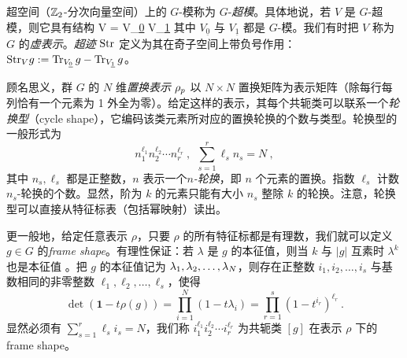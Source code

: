 超空间（$\mathbb{Z}_2$-分次向量空间）上的 $G$-模称为 $G$-\emph{超模}。具体地说，若 $V$ 是 $G$-超模，则它具有结构
\be\label{def:supermodule}
V  = V_{\underline{0}} \oplus V_{\underline{1}}
\ee
其中 $V_{\underline{0}}$ 与 $V_{\underline{1}}$ 都是 $G$-模。我们有时把 $V$ 称为 $G$ 的\emph{虚表示}。\emph{超迹} ${\operatorname{Str}}$ 定义为其在奇子空间上带负号作用：${\operatorname{Str}}_V g := \operatorname{Tr}_{V_{\underline{0}}} g-\operatorname{Tr}_{V_{\underline{1}}}g$。

顾名思义，群 $G$ 的 $N$ 维\emph{置换表示} $\rho_p$ 以 $N\times N$ 置换矩阵为表示矩阵（除每行每列恰有一个元素为 1 外全为零）。给定这样的表示，其每个共轭类可以联系一个\emph{轮换型}（cycle shape），它编码该类元素所对应的置换轮换的个数与类型。轮换型的一般形式为
\begin{equation}
n_1^{\ell_1}n_2^{\ell_2}\cdots n_r^{\ell_r}~,~~\sum_{s=1}^r\ell_s n_s=N~, 
\end{equation}
其中 $n_s, \ell_s$ 都是正整数，$n$ 表示一个\emph{$n$-轮换}，即 $n$ 个元素的置换。指数 $\ell_s$ 计数 $n_s$-轮换的个数。显然，阶为 $k$ 的元素只能有大小 $n_s$ 整除 $k$ 的轮换。注意，轮换型可以直接从特征标表（包括幂映射）读出。

更一般地，给定任意表示 $\rho$，只要 $\rho$ 的所有特征标都是有理数，我们就可以定义 $g\in G$ 的\emph{frame shape}。有理性保证：若 $\lambda$ 是 $g$ 的本征值，则当 $k$ 与 $|g|$ 互素时 $\lambda^k$ 也是本征值 \cite{MasonGeoffrey1984Farc}。把 $g$ 的本征值记为 $\lambda_1, \lambda_2,\dots ,\lambda_N$，则存在正整数 $i_1,i_2,\dots,i_s$ 与基数相同的非零整数 $\ell_1,\ell_2,\dots,\ell_s$，使得
\begin{equation}
\det(\mathbf{1}-t\rho(g))=\prod_{i=1}^N(1-t\lambda_i)=\prod_{r=1}^s(1-t^{i_r})^{\ell_r}~.
\end{equation}
显然必须有 $\sum_{s=1}^r\ell_s i_s=N$，我们称
$
i_1^{\ell_1}i_2^{\ell_2}\cdots i_r^{\ell_r}
$
为共轭类 $[g]$ 在表示 $\rho$ 下的 frame shape。


